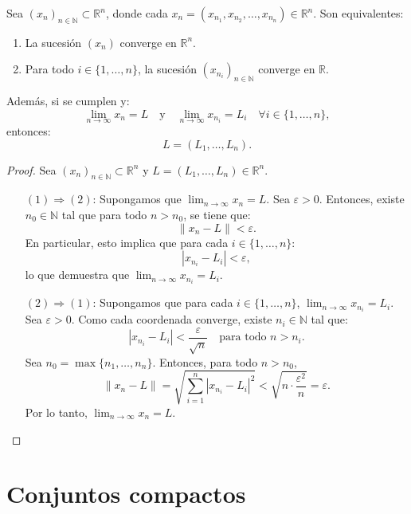 \begin{prop}
  Sea \({(x_n)}_{n \in \mathbb{N}} \subset \mathbb{R}^n\), donde cada \(x_n = (x_{n_1}, x_{n_2}, \ldots, x_{n_n}) \in \mathbb{R}^n\). Son equivalentes:
  \begin{enumerate}
    \item La sucesión \((x_n)\) converge en \(\mathbb{R}^n\).
    \item Para todo \(i \in \{1, \ldots, n\} \), la sucesión \({(x_{n_i})}_{n \in \mathbb{N}} \) converge en \(\mathbb{R} \).
  \end{enumerate}
  Además, si se cumplen y:
  \[
    \lim_{n \to \infty} x_n = L \quad \text{y} \quad \lim_{n \to \infty} x_{n_i} = L_i \quad \forall i \in \{1, \ldots, n\},
  \]
  entonces:
  \[
    L = (L_1, \ldots, L_n).
  \]
  \begin{proof}
    Sea \({(x_n)}_{n \in \mathbb{N}} \subset \mathbb{R}^n\) y \(L = (L_1, \ldots, L_n) \in \mathbb{R}^n\).
    \begin{enumerate}
      \item[\((1) \Rightarrow (2)\):] Supongamos que \(\lim_{n \to \infty} x_n = L\). Sea \(\varepsilon > 0\). Entonces, existe \(n_0 \in \mathbb{N} \) tal que para todo \(n > n_0\), se tiene que:
            \[
              \|x_n - L\| < \varepsilon.
            \]
            En particular, esto implica que para cada \(i \in \{1, \ldots, n\} \):
            \[
              |x_{n_i} - L_i| < \varepsilon,
            \]
            lo que demuestra que \(\lim_{n \to \infty} x_{n_i} = L_i\).

      \item[\((2) \Rightarrow (1)\):] Supongamos que para cada \(i \in \{1, \ldots, n\} \), \(\lim_{n \to \infty} x_{n_i} = L_i\). Sea \(\varepsilon > 0\). Como cada coordenada converge, existe \(n_i \in \mathbb{N} \) tal que:
            \[
              |x_{n_i} - L_i| < \frac{\varepsilon}{\sqrt{n}} \quad \text{para todo } n > n_i.
            \]
            Sea \(n_0 = \max \{n_1, \ldots, n_n\} \). Entonces, para todo \(n > n_0\),
            \[
              \|x_n - L\| = \sqrt{ \sum_{i=1}^n |x_{n_i} - L_i|^2 } < \sqrt{ n \cdot \frac{\varepsilon^2}{n} } = \varepsilon.
            \]
            Por lo tanto, \(\lim_{n \to \infty} x_n = L\).
    \end{enumerate}
  \end{proof}
\end{prop}

\clearpage
\section{Conjuntos compactos}

